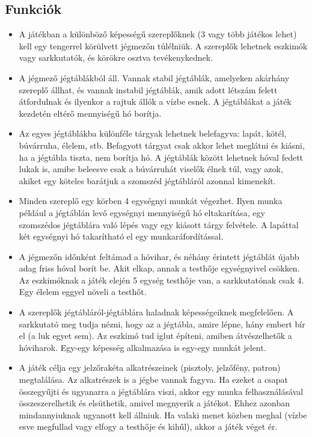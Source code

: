 \subsection{Funkciók}
\begin{itemize}
\item A játékban a különböző képességű szereplőknek (3 vagy több játékos lehet) kell egy tengerrel körülvett jégmezőn túlélniük. A szereplők lehetnek eszkimók vagy sarkkutatók, és körökre osztva tevékenykednek.

\item A jégmező jégtáblákból áll. Vannak stabil jégtáblák, amelyeken akárhány szereplő állhat, és vannak instabil jégtáblák, amik adott létszám felett átfordulnak és ilyenkor a rajtuk állók a vízbe esnek. A jégtáblákat a játék kezdetén eltérő mennyiségű hó borítja.

\item Az egyes jégtáblákba különféle tárgyak lehetnek belefagyva: lapát, kötél, búvárruha, élelem, stb. Befagyott tárgyat csak akkor lehet meglátni és kiásni, ha a jégtábla tiszta, nem borítja hó. A jégtáblák között lehetnek hóval fedett lukak is, amibe beleesve csak a búvárruhát viselők élnek túl, vagy azok, akiket egy köteles barátjuk a szomszéd jégtábláról azonnal kimenekít.

\item Minden szereplő egy körben 4 egységnyi munkát végezhet. Ilyen munka például a jégtáblán levő egységnyi mennyiségű hó eltakarítása, egy szomszédos jégtáblára való lépés vagy egy kiásott tárgy felvétele. A lapáttal két egységnyi hó takarítható el egy munkaráfordítással.

\item A jégmezőn időnként feltámad a hóvihar, és néhány érintett jégtáblát újabb adag friss hóval borít be. Akit elkap, annak a testhője egységnyivel csökken. Az eszkimóknak a játék elején 5 egység testhője van, a sarkkutatónak csak 4. Egy élelem eggyel növeli a testhőt.

\item A szereplők jégtábláról-jégtáblára haladnak képességeiknek megfelelően. A sarkkutató meg tudja nézni, hogy az a jégtábla, amire lépne, hány embert bír el (a luk egyet sem). Az eszkimó tud iglut építeni, amiben átvészelhetők a hóviharok. Egy-egy képesség alkalmazása is egy-egy munkát jelent.

\item A játék célja egy jelzőrakéta alkatrészeinek (pisztoly, jelzőfény, patron) megtalálása. Az alkatrészek is a jégbe vannak fagyva. Ha ezeket a csapat összegyűjti és ugyanarra a jégtáblára viszi, akkor egy munka felhasználásával összeszerelhetik és elsüthetik, amivel megnyerik a játékot. Ehhez azonban mindannyiuknak ugyanott kell állniuk. Ha valaki menet közben meghal (vízbe esve megfullad vagy elfogy a testhője és kihűl), akkor a játék véget ér. 


\end{itemize}
